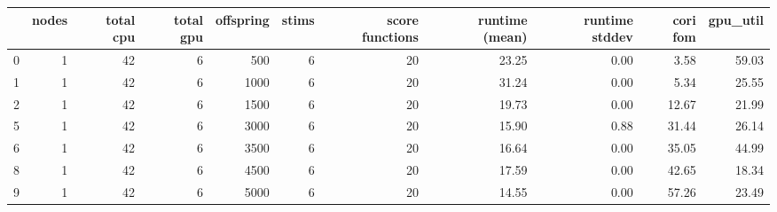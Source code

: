 \begin{tabular}{lrrrrrrrrrr}
\toprule
{} &  nodes &  total cpu &  total gpu &  offspring &  stims &  score functions & runtime (mean) & runtime stddev & cori fom & gpu\_util \\
\midrule
0 &      1 &         42 &          6 &        500 &      6 &               20 &          23.25 &           0.00 &     3.58 &    59.03 \\
1 &      1 &         42 &          6 &       1000 &      6 &               20 &          31.24 &           0.00 &     5.34 &    25.55 \\
2 &      1 &         42 &          6 &       1500 &      6 &               20 &          19.73 &           0.00 &    12.67 &    21.99 \\
5 &      1 &         42 &          6 &       3000 &      6 &               20 &          15.90 &           0.88 &    31.44 &    26.14 \\
6 &      1 &         42 &          6 &       3500 &      6 &               20 &          16.64 &           0.00 &    35.05 &    44.99 \\
8 &      1 &         42 &          6 &       4500 &      6 &               20 &          17.59 &           0.00 &    42.65 &    18.34 \\
9 &      1 &         42 &          6 &       5000 &      6 &               20 &          14.55 &           0.00 &    57.26 &    23.49 \\
\bottomrule
\end{tabular}
